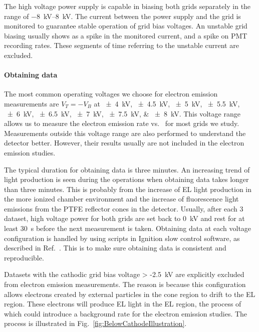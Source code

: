 The high voltage power supply is capable in biasing both grids separately in the range of \SIrange{-8}{8}{\kV}. The current between the power supply and the grid is monitored to guarantee stable operation of grid bias voltages. An unstable grid biasing usually shows as a spike in the monitored current, and a spike on PMT recording rates. These segments of time referring to the unstable current are excluded.  

\paragraph{Obtaining data} %
The most common operating voltages we choose for electron emission measurements are $V_{T}=-V_{B} $ at \SIlist{\pm 4; \pm 4.5; \pm 5; \pm 5.5;\pm 6; \pm 6.5;\pm 7; \pm 7.5;\pm 8}{\kV}. This voltage range allows us to measure the electron emission rate vs. \opdv\ for most grids we study. Measurements outside this voltage range are also performed to understand the detector better. However, their results usually are not included in the electron emission studies.

The typical duration for obtaining data is three minutes. An increasing trend of light production is seen during the operations when obtaining data takes longer than three minutes. This is probably from the increase of EL light production in the more ionized chamber environment and the increase of fluorescence light emissions from the PTFE reflector cones in the detector. Usually, after each \SI{3}{\min} dataset, high voltage power for both grids are set back to \SI{0}{\kV} and rest for at least \SI{30}{\s} before the next measurement is taken. Obtaining data at each voltage configuration is handled by using scripts in Ignition slow control software, as described in Ref.~\cite{Ignition2018}. This is to make sure obtaining data is consistent and reproducible.

Datasets with the cathodic grid bias voltage \SI{> -2.5}{\kV} are explicitly excluded from electron emission measurements. The reason is because this configuration allows electrons created by external particles in the cone region to drift to the EL region. These electrons will produce EL light in the EL region, the process of which could introduce a background rate for the electron emission studies. The process is illustrated in Fig.~\ref{fig:BelowCathodeIllustration}.


